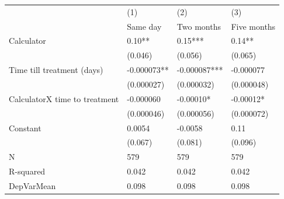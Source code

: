 \begin{tabular}{llll}
\toprule
      & (1)   & (2)   & (3) \\
      & Same day & Two months & Five months \\
\midrule
Calculator & 0.10** & 0.15*** & 0.14** \\
      & (0.046) & (0.056) & (0.065) \\
Time till treatment (days) & -0.000073** & -0.000087*** & -0.000077 \\
      & (0.000027) & (0.000032) & (0.000048) \\
CalculatorX time to treatment & -0.000060 & -0.00010* & -0.00012* \\
      & (0.000046) & (0.000056) & (0.000072) \\
Constant & 0.0054 & -0.0058 & 0.11 \\
      & (0.067) & (0.081) & (0.096) \\
\midrule
N     & 579   & 579   & 579 \\
R-squared & 0.042 & 0.042 & 0.042 \\
DepVarMean & 0.098 & 0.098 & 0.098 \\
\bottomrule
\bottomrule
\end{tabular}%
